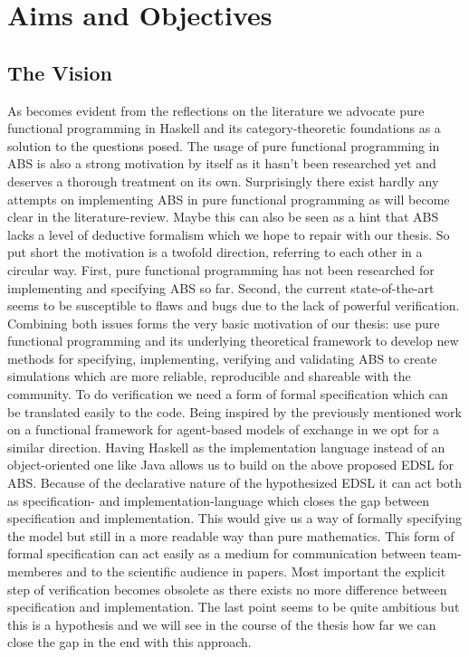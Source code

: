 \chapter{Aims and Objectives}
\label{chap:aimsObj}

\section{The Vision}
As becomes evident from the reflections on the literature we advocate pure functional programming in Haskell and its category-theoretic foundations as a solution to the questions posed. The usage of pure functional programming in ABS is also a strong motivation by itself as it hasn't been researched yet and deserves a thorough treatment on its own. Surprisingly there exist hardly any attempts on implementing ABS in pure functional programming as will become clear in the literature-review. Maybe this can also be seen as a hint that ABS lacks a level of deductive formalism which we hope to repair with our thesis. So put short the motivation is a twofold direction, referring to each other in a circular way. First, pure functional programming has not been researched for implementing and specifying ABS so far. Second, the current state-of-the-art seems to be susceptible to flaws and bugs due to the lack of powerful verification. Combining both issues forms the very basic motivation of our thesis: use pure functional programming and its underlying theoretical framework to develop new methods for specifying, implementing, verifying and validating ABS to create simulations which are more reliable, reproducible and shareable with the community.
To do verification we need a form of formal specification which can be translated easily to the code. Being inspired by the previously mentioned work on a functional framework for agent-based models of exchange in \cite{botta_functional_2011} we opt for a similar direction. Having Haskell as the implementation language instead of an object-oriented one like Java allows us to build on the above proposed EDSL for ABS. Because of the declarative nature of the hypothesized EDSL it can act both as specification- and implementation-language which closes the gap between specification and implementation. This would give us a way of formally specifying the model but still in a more readable way than pure mathematics. This form of formal specification can act easily as a medium for communication between team-memberes and to the scientific audience in papers. Most important the explicit step of verification becomes obsolete as there exists no more difference between specification and implementation. The last point seems to be quite ambitious but this is a hypothesis and we will see in the course of the thesis how far we can close the gap in the end with this approach.
